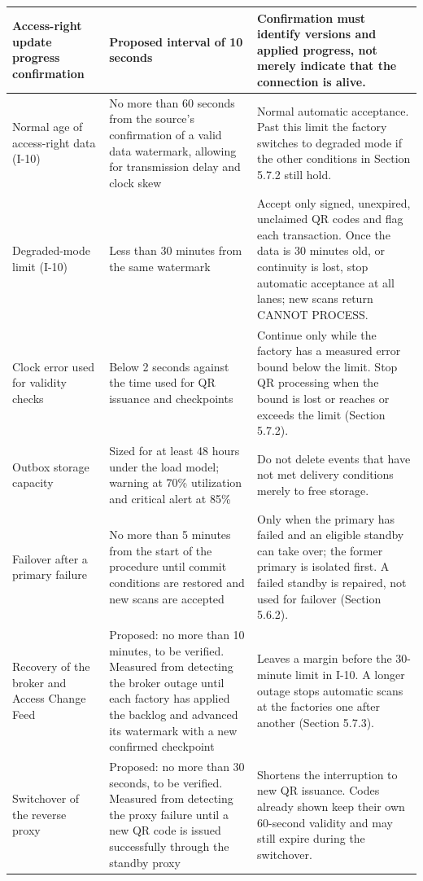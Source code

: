 \begin{longtable}{|>{\raggedright\arraybackslash}p{95.5pt}|>{\raggedright\arraybackslash}p{156.5pt}|>{\raggedright\arraybackslash}p{158.5pt}|}
\hline
Access-right update progress confirmation & Proposed interval of 10 seconds & Confirmation must identify versions and applied progress, not merely indicate that the connection is alive. \\
\hline
Normal age of access-right data (I-10) & No more than 60 seconds from the source's confirmation of a valid data watermark, allowing for transmission delay and clock skew & Normal automatic acceptance. Past this limit the factory switches to degraded mode if the other conditions in Section 5.7.2 still hold. \\
\hline
Degraded-mode limit (I-10) & Less than 30 minutes from the same watermark & Accept only signed, unexpired, unclaimed QR codes and flag each transaction. Once the data is 30 minutes old, or continuity is lost, stop automatic acceptance at all lanes; new scans return CANNOT PROCESS. \\
\hline
Clock error used for validity checks & Below 2 seconds against the time used for QR issuance and checkpoints & Continue only while the factory has a measured error bound below the limit. Stop QR processing when the bound is lost or reaches or exceeds the limit (Section 5.7.2). \\
\hline
Outbox storage capacity & Sized for at least 48 hours under the load model; warning at 70\% utilization and critical alert at 85\% & Do not delete events that have not met delivery conditions merely to free storage. \\
\hline
Failover after a primary failure & No more than 5 minutes from the start of the procedure until commit conditions are restored and new scans are accepted & Only when the primary has failed and an eligible standby can take over; the former primary is isolated first. A failed standby is repaired, not used for failover (Section 5.6.2). \\
\hline
Recovery of the broker and Access Change Feed & Proposed: no more than 10 minutes, to be verified. Measured from detecting the broker outage until each factory has applied the backlog and advanced its watermark with a new confirmed checkpoint & Leaves a margin before the 30-minute limit in I-10. A longer outage stops automatic scans at the factories one after another (Section 5.7.3). \\
\hline
Switchover of the reverse proxy & Proposed: no more than 30 seconds, to be verified. Measured from detecting the proxy failure until a new QR code is issued successfully through the standby proxy & Shortens the interruption to new QR issuance. Codes already shown keep their own 60-second validity and may still expire during the switchover. \\

\end{longtable}
